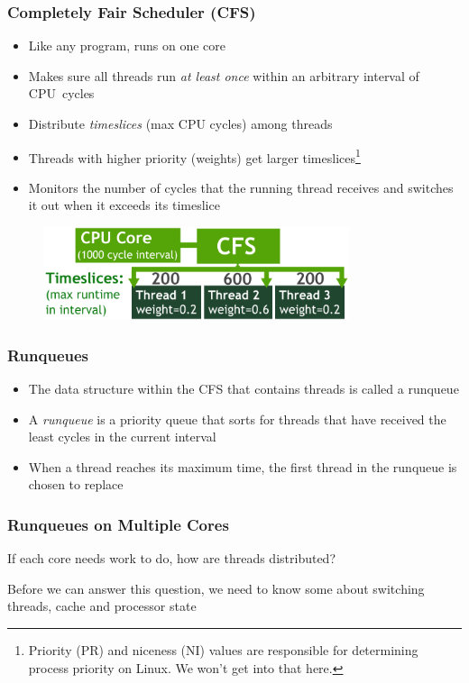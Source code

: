 \documentclass{beamer}
\newcommand{\linespace}{\vskip 0.25cm}
\begin{document}
\begin{frame}
\frametitle{Completely Fair Scheduler (CFS)}

\begin{itemize}
\item Like any program, runs on one core
\item Makes sure all threads run \emph{at least once} within an arbitrary interval of CPU~cycles
\item Distribute \emph{timeslices} (max CPU cycles) among threads
\item Threads with higher priority (weights) get larger timeslices\footnote{Priority (PR) and niceness (NI) values are responsible for determining process priority on Linux. We won't get into that here.}
\item Monitors the number of cycles that the running thread receives and switches it out when it exceeds its timeslice
\end{itemize}

\begin{figure}
		\includegraphics[width=0.8\textwidth]{Illustrations/CFS}
		\label{fig:cfs}
\end{figure}

\linespace

\end{frame}

\begin{frame}
\frametitle{Runqueues}

\begin{itemize}
	\item The data structure within the CFS that contains threads is called a runqueue
	\item A \emph{runqueue} is a priority queue that sorts for threads that have received the least cycles in the current interval
	\item When a thread reaches its maximum time, the first thread in the runqueue is chosen to replace
\end{itemize}

\end{frame}




\begin{frame}
\frametitle{Runqueues on Multiple Cores}
If each core needs work to do, how are threads distributed?

\linespace

Before we can answer this question, we need to know some about switching threads, cache and processor state

\end{frame}
\end{document}
